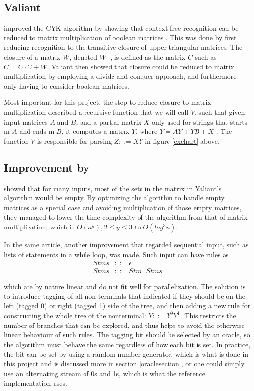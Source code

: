 \documentclass[a4paper,12pt,notitlepage]{report}
\renewcommand\cite{\citep}
\begin{document}
\subsection{Valiant}
\citeauthor{Valiant75} improved the CYK algorithm by showing that
context-free recognition can be reduced to matrix multiplication of boolean
matrices \cite{Valiant75}. This was done by first reducing recognition to the
transitive closure of upper-triangular matrices.  The closure of a matrix $W$,
denoted $W^+$, is defined as the matrix $C$ such as $C = C \cdot C + W$.
Valiant then showed that closure could be reduced to matrix multiplication by
employing a divide-and-conquer approach, and furthermore only having to consider
boolean matrices. 

Most important for this project, the step to reduce closure to matrix
multiplication described a recursive function that we will call $V$, such that
given input matrices $A$ and $B$, and a partial matrix $X$ only used for strings
that starts in $A$ and ends in $B$, it computes a matrix $Y$, where $Y = AY + YB
+ X$ \cite{parparsepaper}. The function $V$ is responsible for parsing $Z ::=
XY$ in figure \ref{exchart} above.

\subsection{Improvement by \citeauthor{parparsepaper}}
\citet{parparsepaper} showed that for many inputs, most of the sets in the
matrix in Valiant's algorithm would be empty. By optimizing the algorithm to
handle empty matrices as a special case and avoiding multiplication of those
empty matrices, they managed to lower the time complexity of the algorithm from
that of matrix multiplication, which is $O(n^y), 2 \leq y \leq 3$ to $O(log^3
n)$. 

In the same article, another improvement that regarded sequential input, such as
lists of statements in a while loop, was made. Such input can have rules as
\begin{align*}
Stms &::= \epsilon \\
Stms &::= Stm\text{ }Stms
\end{align*}

which are by nature linear and do not fit well for parallelization. The
solution is to introduce tagging of all non-terminals that indicated if they
should be on the left (tagged 0) or right (tagged 1) side of the tree, and then
adding a new rule for constructing the whole tree of the nonterminal: $Y ::=
Y^0Y^1$. This restricts the number of branches that can be explored, and thus
helps to avoid the otherwise linear behaviour of such rules. The tagging bit
should be selected by an oracle, so the algorithm must behave the same
regardless of how each bit is set. In practice, the bit can be set by using a
random number generator, which is what is done in this project and is discussed
more in section \ref{oraclesection}, or one could simply use an alternating
stream of 0s and 1s, which is what the reference implementation uses. 
\end{document}
